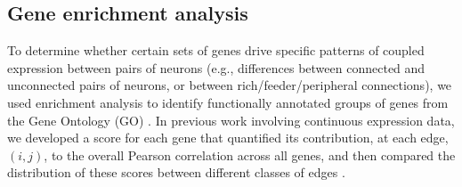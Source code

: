 \documentclass[10pt,letterpaper]{article}
\begin{document}

\subsection*{Gene enrichment analysis}
To determine whether certain sets of genes drive specific patterns of coupled expression between pairs of neurons (e.g., differences between connected and unconnected pairs of neurons, or between rich/feeder/peripheral connections), we used enrichment analysis to identify functionally annotated groups of genes from the Gene Ontology (GO) \cite{Ashburner2000}.
In previous work involving continuous expression data, we developed a score for each gene that quantified its contribution, at each edge, $(i,j)$, to the overall Pearson correlation across all genes, and then compared the distribution of these scores between different classes of edges \cite{Fulcher:2016ck}.
\end{document}
